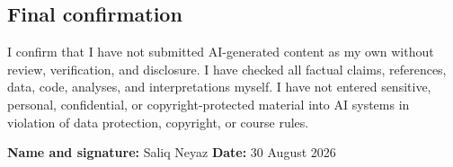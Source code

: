\documentclass[11pt]{article}
\begin{document}
\bigskip

\subsection*{Final confirmation}

\noindent
I confirm that I have not submitted AI-generated content as my own without review,
verification, and disclosure. I have checked all factual claims, references, data,
code, analyses, and interpretations myself. I have not entered sensitive,
personal, confidential, or copyright-protected material into AI systems in
violation of data protection, copyright, or course rules.

\bigskip
\bigskip

\noindent
\textbf{Name and signature:} Saliq Neyaz
\hfill
\textbf{Date:} 30 August 2026
\end{document}
